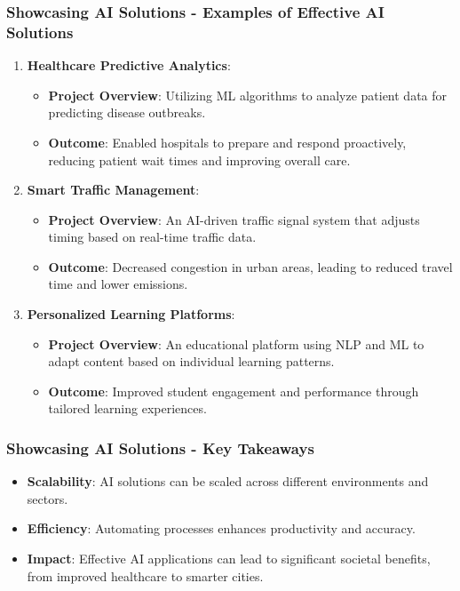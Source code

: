 \documentclass{beamer}
\begin{document}
\begin{frame}[fragile]
    \frametitle{Showcasing AI Solutions - Examples of Effective AI Solutions}
    \begin{enumerate}
        \item \textbf{Healthcare Predictive Analytics}:
        \begin{itemize}
            \item \textbf{Project Overview}: Utilizing ML algorithms to analyze patient data for predicting disease outbreaks.
            \item \textbf{Outcome}: Enabled hospitals to prepare and respond proactively, reducing patient wait times and improving overall care.
        \end{itemize}

        \item \textbf{Smart Traffic Management}:
        \begin{itemize}
            \item \textbf{Project Overview}: An AI-driven traffic signal system that adjusts timing based on real-time traffic data.
            \item \textbf{Outcome}: Decreased congestion in urban areas, leading to reduced travel time and lower emissions.
        \end{itemize}

        \item \textbf{Personalized Learning Platforms}:
        \begin{itemize}
            \item \textbf{Project Overview}: An educational platform using NLP and ML to adapt content based on individual learning patterns.
            \item \textbf{Outcome}: Improved student engagement and performance through tailored learning experiences.
        \end{itemize}
    \end{enumerate}
\end{frame}

\begin{frame}[fragile]
    \frametitle{Showcasing AI Solutions - Key Takeaways}
    \begin{itemize}
        \item \textbf{Scalability}: AI solutions can be scaled across different environments and sectors.
        \item \textbf{Efficiency}: Automating processes enhances productivity and accuracy.
        \item \textbf{Impact}: Effective AI applications can lead to significant societal benefits, from improved healthcare to smarter cities.
    \end{itemize}
\end{frame}
\end{document}
